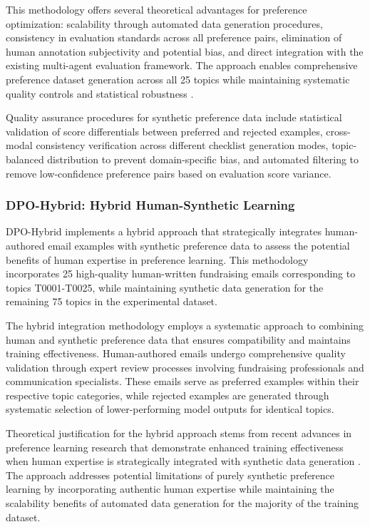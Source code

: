 This methodology offers several theoretical advantages for preference optimization: scalability through automated data generation procedures, consistency in evaluation standards across all preference pairs, elimination of human annotation subjectivity and potential bias, and direct integration with the existing multi-agent evaluation framework. The approach enables comprehensive preference dataset generation across all 25 topics while maintaining systematic quality controls and statistical robustness \cite{liu2024rs_dpo}.

Quality assurance procedures for synthetic preference data include statistical validation of score differentials between preferred and rejected examples, cross-modal consistency verification across different checklist generation modes, topic-balanced distribution to prevent domain-specific bias, and automated filtering to remove low-confidence preference pairs based on evaluation score variance.

\subsubsection{DPO-Hybrid: Hybrid Human-Synthetic Learning}

DPO-Hybrid implements a hybrid approach that strategically integrates human-authored email examples with synthetic preference data to assess the potential benefits of human expertise in preference learning. This methodology incorporates 25 high-quality human-written fundraising emails corresponding to topics T0001-T0025, while maintaining synthetic data generation for the remaining 75 topics in the experimental dataset.

The hybrid integration methodology employs a systematic approach to combining human and synthetic preference data that ensures compatibility and maintains training effectiveness. Human-authored emails undergo comprehensive quality validation through expert review processes involving fundraising professionals and communication specialists. These emails serve as preferred examples within their respective topic categories, while rejected examples are generated through systematic selection of lower-performing model outputs for identical topics.

Theoretical justification for the hybrid approach stems from recent advances in preference learning research that demonstrate enhanced training effectiveness when human expertise is strategically integrated with synthetic data generation \cite{poddar2024personalizing_rlhf}. The approach addresses potential limitations of purely synthetic preference learning by incorporating authentic human expertise while maintaining the scalability benefits of automated data generation for the majority of the training dataset.

